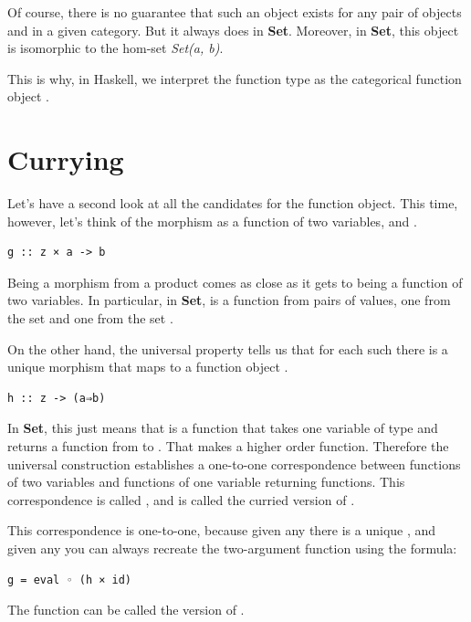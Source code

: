 \noindent
Of course, there is no guarantee that such an object  exists
for any pair of objects  and  in a given category.
But it always does in \textbf{Set}. Moreover, in \textbf{Set}, this
object is isomorphic to the hom-set \emph{Set(a, b)}.

This is why, in Haskell, we interpret the function type
 as the categorical function object
.

\section{Currying}\label{currying}

Let's have a second look at all the candidates for the function object.
This time, however, let's think of the morphism  as a function
of two variables,  and .

\begin{verbatim}
g :: z × a -> b
\end{verbatim}
Being a morphism from a product comes as close as it gets to being a
function of two variables. In particular, in \textbf{Set},  is
a function from pairs of values, one from the set  and one
from the set .

On the other hand, the universal property tells us that for each such
 there is a unique morphism  that maps  to
a function object .

\begin{verbatim}
h :: z -> (a⇒b)
\end{verbatim}
In \textbf{Set}, this just means that  is a function that
takes one variable of type  and returns a function from
 to . That makes  a higher order function.
Therefore the universal construction establishes a one-to-one
correspondence between functions of two variables and functions of one
variable returning functions. This correspondence is called
, and  is called the curried version of
.

This correspondence is one-to-one, because given any  there is
a unique , and given any  you can always recreate
the two-argument function  using the formula:

\begin{verbatim}
g = eval ◦ (h × id)
\end{verbatim}
The function  can be called the  version of
.

